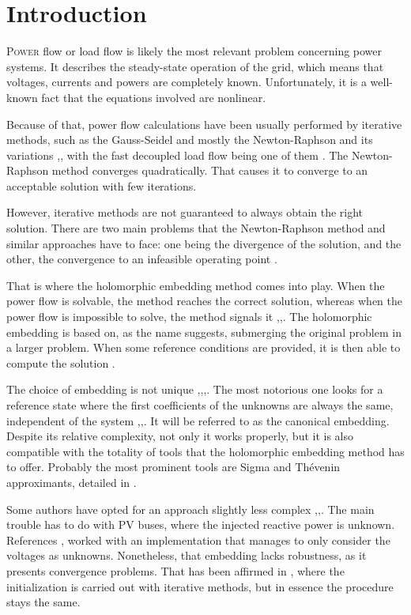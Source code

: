 \documentclass[conference]{IEEEtran}
\begin{document}
\section{Introduction}
\lettrine{P}{ower} flow or load flow is likely the most relevant problem concerning power systems. It describes the steady-state operation of the grid, which means that voltages, currents and powers are completely known. Unfortunately, it is a well-known fact that the equations involved are nonlinear. 

Because of that, power flow calculations have been usually performed by iterative methods, such as the Gauss-Seidel and mostly the Newton-Raphson and its variations \cite{Novel},\cite{gomez}, with the fast decoupled load flow being one of them \cite{Stott}. The Newton-Raphson method converges quadratically. That causes it to converge to an acceptable solution with few iterations.

However, iterative methods are not guaranteed to always obtain the right solution. There are two main problems that the Newton-Raphson method and similar approaches have to face: one being the divergence of the solution, and the other, the convergence to an infeasible operating point \cite{Novel}. 

That is where the holomorphic embedding method comes into play. When the power flow is solvable, the method reaches the correct solution, whereas when the power flow is impossible to solve, the method signals it \cite{Trias2012},\cite{Trias2018},\cite{Trias_sigma}. The holomorphic embedding is based on, as the name suggests, submerging the original problem in a larger problem. When some reference conditions are provided, it is then able to compute the solution \cite{Trias2018}.

The choice of embedding is not unique \cite{Novel},\cite{Trias2018},\cite{TriasMarin},\cite{Schmidt}. The most notorious one looks for a reference state where the first coefficients of the unknowns are always the same, independent of the system \cite{Trias2018},\cite{Rao},\cite{Tylavsky3}. It will be referred to as the canonical embedding. Despite its relative complexity, not only it works properly, but it is also compatible with the totality of tools that the holomorphic embedding method has to offer. Probably the most prominent tools are Sigma and Thévenin approximants, detailed in \cite{Trias2018}. 

Some authors have opted for an approach slightly less complex \cite{Novel},\cite{Schmidt},\cite{subramanianPV}. The main trouble has to do with PV buses, where the injected reactive power is unknown. References \cite{Schmidt},\cite{Subramanian} worked with an implementation that manages to only consider the voltages as unknowns. Nonetheless, that embedding lacks robustness, as it presents convergence problems. That has been affirmed in \cite{Novel}, where the initialization is carried out with iterative methods, but in essence the procedure stays the same. 
\end{document}
